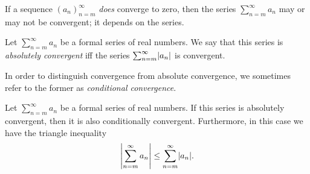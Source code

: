 \begin{note}
If a sequence \((a_n)_{n = m}^\infty\) \emph{does} converge to zero, then the series \(\sum_{n = m}^\infty a_n\) may or may not be convergent;
it depends on the series.
\end{note}

\setcounter{theorem}{7}
\begin{definition}\label{7.2.8}
Let \(\sum_{n = m}^\infty a_n\) be a formal series of real numbers.
We say that this series is \emph{absolutely convergent} iff the series \(\sum_{n = m}^\infty \abs*{a_n}\) is convergent.
\end{definition}

\begin{note}
In order to distinguish convergence from absolute convergence, we sometimes refer to the former as \emph{conditional convergence}.
\end{note}

\begin{proposition}\label{7.2.9}
Let \(\sum_{n = m}^\infty a_n\) be a formal series of real numbers.
If this series is absolutely convergent, then it is also conditionally convergent.
Furthermore, in this case we have the triangle inequality
\[
    \abs*{\sum_{n = m}^\infty a_n} \leq \sum_{n = m}^\infty \abs*{a_n}.
\]
\end{proposition}

